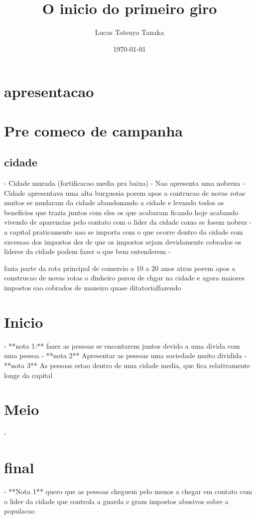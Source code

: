 \documentclass{book}
\title{O inicio do primeiro giro}
\author{Lucas Tatsuya Tanaka}
\date{\today}
\begin{document}
\maketitle
\tableofcontents

 \chapter{apresentacao}

 \chapter{Pre comeco de campanha}
 \section{cidade}
- Cidade murada (fortificacao media pra baixa)
- Nao apresenta uma nobreza 
- Cidade apresentava uma alta burguesia porem apos a contrucao de novas rotas muitos se mudaram da cidade abandonando a cidade e levando todos os beneficios que trazia juntos com eles os que acabaram ficando hoje acabando vivendo de aparencias pelo contato com o lider da cidade como se fosem nobrez 
- a capital praticamente nao se importa com o que ocorre dentro da cidade com excessao dos impostos des de que os impostos sejam devidamente cobrados os lideres da cidade podem fazer o que bem entenderem 
- 

fazia parte da rota principal de comercio a 10 a 20  anos atras porem apos  a construcao de novas rotas o dinheiro parou de chgar na cidade e agora maiores impostos sao cobrados de maneiro quase ditatorialfazendo

\chapter{Inicio}

- **nota 1:** fazer as pessoas se encontarem juntos devido a uma divida com uma pessoa 
- **nota 2** Apresentar as pessoas uma sociedade muito dividida 
- **nota 3** As pessoas estao dentro de uma cidade media, que fica relativamente longe da capital

\chapter{Meio}

- 

\chapter{final}

- **Nota 1** quero que as pessoas cheguem pelo menos a chegar em contato com o lider da cidade que controla a guarda e gram impostos abusivos sobre a populacao    
\end{document}
